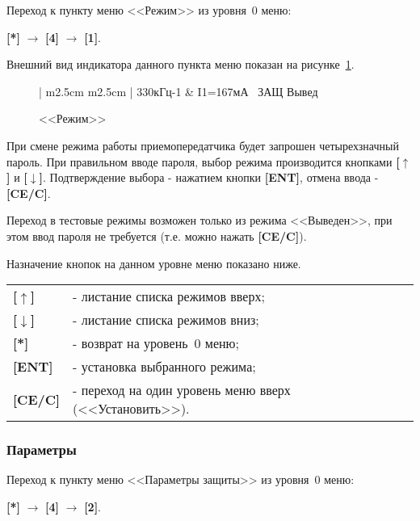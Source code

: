 Переход к пункту меню <<Режим>> из уровня~0 меню: 

\textbf{[*]} $\rightarrow$ \textbf{[4]} $\rightarrow$ \textbf{[1]}.

Внешний вид индикатора данного пункта меню показан на рисунке~\ref{fig:setup_regime}.
 
 \begin{figure}[H]
 	\centering
 	
	\begin{tabular}{| m{2.5cm}  m{2.5cm} |}
		\firsthline
		330кГц-1	& \raggedleft I1=167мА		\tabularnewline 
		 {~ЗАЩ}		\tabularnewline
		 {Вывед} 	\tabularnewline 
		 {}			\tabularnewline 
		\lasthline
	\end{tabular} 
	
	\caption{<<Режим>>}
	\label{fig:setup_regime}
\end{figure}

При смене режима работы приемопередатчика будет запрошен четырехзначный пароль. При правильном вводе пароля, выбор режима производится кнопками \textbf{[$\uparrow$]} и \textbf{[$\downarrow$]}. Подтверждение выбора - нажатием кнопки \textbf{[ENT]}, отмена ввода - \textbf{[CE/C]}.

Переход в тестовые режимы возможен только из режима <<Выведен>>, при этом ввод пароля не требуется (т.е. можно нажать \textbf{[CE/C]}).

Назначение кнопок на данном уровне меню показано ниже.
\begin{center}
	\begin{tabular}{p{2cm} p{15cm}}
		\textbf{[$\uparrow$]}  	& - листание списка режимов вверх; \tabularnewline
		\textbf{[$\downarrow$]} & - листание списка режимов вниз; \tabularnewline
		\textbf{[*]} 			& - возврат на уровень~0 меню; \tabularnewline
		\textbf{[ENT]} 			& - установка выбранного режима; \tabularnewline
		\textbf{[CE/C]} 		& - переход на один уровень меню вверх (<<Установить>>). \tabularnewline				
	\end{tabular}
\end{center} 


\subsubsection{Параметры} \label{sssec:setup_param}

Переход к пункту меню <<Параметры защиты>> из уровня~0 меню:

\textbf{[*]} $\rightarrow$ \textbf{[4]} $\rightarrow$ \textbf{[2]}.

